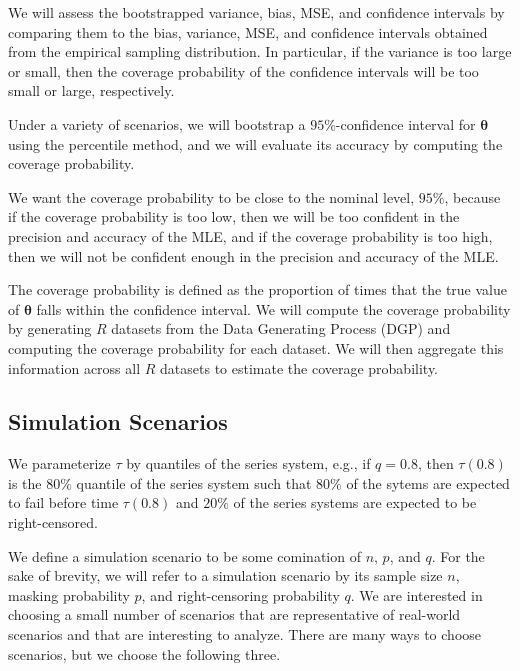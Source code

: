 \documentclass[
]{article}
\begin{document}
We will assess the bootstrapped variance, bias, MSE, and confidence
intervals by comparing them to the bias, variance, MSE, and confidence
intervals obtained from the empirical sampling distribution. In
particular, if the variance is too large or small, then the coverage
probability of the confidence intervals will be too small or large,
respectively.

Under a variety of scenarios, we will bootstrap a \(95\%\)-confidence
interval for \(\boldsymbol{\theta}\) using the percentile method, and we
will evaluate its accuracy by computing the coverage probability.

We want the coverage probability to be close to the nominal level,
\(95\%\), because if the coverage probability is too low, then we will
be too confident in the precision and accuracy of the MLE, and if the
coverage probability is too high, then we will not be confident enough
in the precision and accuracy of the MLE.

The coverage probability is defined as the proportion of times that the
true value of \(\boldsymbol{\theta}\) falls within the confidence
interval. We will compute the coverage probability by generating \(R\)
datasets from the Data Generating Process (DGP) and computing the
coverage probability for each dataset. We will then aggregate this
information across all \(R\) datasets to estimate the coverage
probability.

\hypertarget{simulation-scenarios}{%
\subsection{Simulation Scenarios}\label{simulation-scenarios}}

We parameterize \(\tau\) by quantiles of the series system, e.g., if
\(q = 0.8\), then \(\tau(0.8)\) is the \(80\%\) quantile of the series
system such that \(80\%\) of the sytems are expected to fail before time
\(\tau(0.8)\) and \(20\%\) of the series systems are expected to be
right-censored.

We define a simulation scenario to be some comination of \(n\), \(p\),
and \(q\). For the sake of brevity, we will refer to a simulation
scenario by its sample size \(n\), masking probability \(p\), and
right-censoring probability \(q\). We are interested in choosing a small
number of scenarios that are representative of real-world scenarios and
that are interesting to analyze. There are many ways to choose
scenarios, but we choose the following three.
\end{document}
